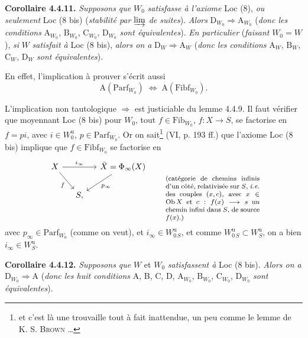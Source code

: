 \documentclass[11pt]{article}
\newcommand{\msp}[1]{\marginpar{\footnotesize [#1]}}
\newcommand{\Ob}{\mathrm{Ob}\,}
\newcommand{\Fib}{\mathrm{Fib}}
\newcommand{\Fibf}{\mathrm{Fibf}}
\newcommand{\Parf}{\mathrm{Parf}}
\begin{document}
\textbf{Corollaire 4.4.11.} \textit{Supposons que} $W_0$ \textit{satisfasse à l'axiome} Loc (8), \textit{ou seulement} Loc (8 bis) (\textit{stabilité par} $\varinjlim$ \textit{de suites}). \textit{Alors} $\mathrm{D}_{W_0} \Longrightarrow \mathrm{A}_{W_0}$ (\textit{donc les conditions} $\mathrm{A}_{W_0}$, $\mathrm{B}_{W_0}$, $\mathrm{C}_{W_0}$, $\mathrm{D}_{W_0}$ \textit{sont équivalentes}). \textit{En particulier} (\textit{faisant} $W_0 = W$), \textit{si} $W$ \textit{satisfait à} Loc (8 bis), \textit{alors on a} $\mathrm{D}_W \Longrightarrow \mathrm{A}_W$ (\textit{donc les conditions} $\mathrm{A}_W$, $\mathrm{B}_W$, $\mathrm{C}_W$, $\mathrm{D}_W$ \textit{sont équivalentes}).

En effet, l'implication à prouver s'écrit aussi
\[
\mathrm{A}(\Parf_{W_0}) \;\Longleftrightarrow\; \mathrm{A}(\Fibf_{W_0}).
\]

L'implication non tautologique $\Longrightarrow$ est justiciable du lemme 4.4.9. Il faut vérifier que moyennant Loc (8 bis) pour $W_0$, tout $f \in \Fib_{W_0}$, $f : X \longrightarrow S$, se factorise en $f = pi$, avec $i \in W^{\mathrm{u}}_0$, $p \in \Parf_{W_0}$. Or on sait\footnote{et c'est là une trouvaille tout à fait inattendue, un peu comme le lemme de K. S. \textsc{Brown} \ldots} (VI, p. 193 ff.) %
\msp{page 57}
que l'axiome Loc (8 bis) implique que $f \in \Fibf_{W_0}$ se factorise en
\[
\begin{tikzcd}[column sep=small]
X \arrow[rr, "i_\infty"] \arrow[dr, "f"'] & & \bar{X} = \Phi_\infty(X) \arrow[dl, "p_\infty"] \\
& S, &
\end{tikzcd}
\qquad
\text{\parbox[t]{0.33\textwidth}{\footnotesize (catégorie de chemins infinis d'un côté, relativisée sur $S$, \textit{i.e.} des couples $(x,c)$, avec $x \in \Ob X$ et $c : f(x) \longrightarrow s$ un chemin infini dans $S$, de source $f(x)$.)}}
\]
avec $p_\infty \in \Parf_{W_0}$ (comme on veut), et $i_\infty \in W^{\mathrm{u}}_{0\,S}$, et comme $W^{\mathrm{u}}_{0\,S} \subset W^{\mathrm{u}}_S$, on a bien $i_\infty \in W^{\mathrm{u}}_S$.

\textbf{Corollaire 4.4.12.} \textit{Supposons que} $W$ et $W_0$ \textit{satisfassent à} Loc (8 bis). \textit{Alors on a} $\mathrm{D}_{W_0} \Longrightarrow \mathrm{A}$ (\textit{donc les huit conditions} A, B, C, D, $\mathrm{A}_{W_0}$, $\mathrm{B}_{W_0}$, $\mathrm{C}_{W_0}$, $\mathrm{D}_{W_0}$ \textit{sont équivalentes}).
\end{document}
